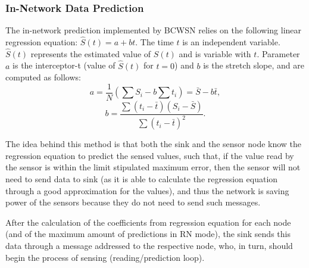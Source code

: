 \documentclass[conference]{IEEEtran}
\begin{document}
\subsubsection{In-Network Data Prediction}
\label{data-predict}

The in-network prediction implemented by BCWSN relies on the
following linear regression equation: $\hat{S}(t) = a + bt$.
The time $t$ is an independent variable. $\hat{S}(t)$ represents the estimated
value of $S(t)$ and is variable with $t$. Parameter $a$ is the interceptor-t
(value of $\hat{S}(t)$ for $t=0$) and $b$ is the stretch slope, and are computed
as follows:
\begin{equation}
	a = \frac{1}{N}\left(\sum S_{i} - b\sum t_{i} \right) = \bar{S} - b\bar{t},
\end{equation}
\vspace*{-.3cm}
\begin{equation}
	b = \frac{\sum \left(t_{i} - \bar{t}\right)\left(S_{i} - \bar{S}\right)}{\sum \left(t_{i} - \bar{t}\right)^{2}}.
\end{equation}

The idea behind this method is that both the sink and the sensor node know the
regression equation to predict the sensed values​​, such that, if the value read
by the sensor is within the limit stipulated maximum error, then the sensor will
not need to send data to sink (as it is able to calculate the regression
equation through a good approximation for the values​​), and thus the network is
saving power of the sensors because they do not need to send such messages.

After the calculation of the coefficients from regression equation for each
node (and of the maximum amount of predictions in RN mode), the
sink sends this data through a message addressed to the respective node, who, in
turn, should begin the process of sensing (reading/prediction loop).
\end{document}

